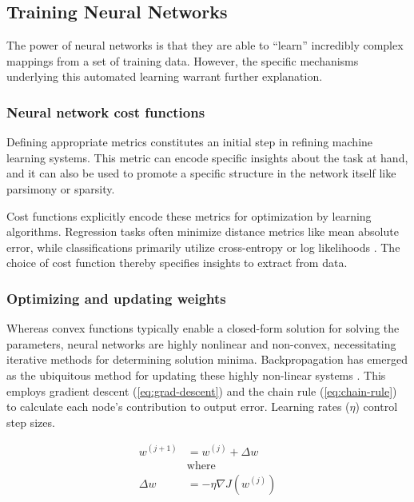 \subsection{Training Neural Networks}

The power of neural networks is that they are able to ``learn'' incredibly complex mappings from a set of training data.
However, the specific mechanisms underlying this automated learning warrant further explanation.

\subsubsection{Neural network cost functions}

Defining appropriate metrics constitutes an initial step in refining machine learning systems.
This metric can encode specific insights about the task at hand, and it can also be used to promote a specific structure in the network itself like parsimony or sparsity.

Cost functions explicitly encode these metrics for optimization by learning algorithms.
Regression tasks often minimize distance metrics like mean absolute error, while classifications primarily utilize cross-entropy or log likelihoods \cite{paszkePyTorchImperativeStyle2019}.
The choice of cost function thereby specifies insights to extract from data.

\subsubsection{Optimizing and updating weights}

Whereas convex functions typically enable a closed-form solution \cite{boydConvexOptimization2004} for solving the parameters, neural networks are highly nonlinear and non-convex, necessitating iterative methods for determining solution minima.
Backpropagation has emerged as the ubiquitous method for updating these highly non-linear systems \cite{rumelhartLearningRepresentationsBackpropagating1986}.
This employs gradient descent (\cref{eq:grad-descent}) and the chain rule (\cref{eq:chain-rule}) to calculate each node's contribution to output error.
Learning rates ($\eta$) control step sizes.

\begin{equation}
    \begin{aligned}
        w^{(j+1)} &= w^{(j)} + \Delta w\\
        &\text{where} \\
        \Delta w &= -\eta \nabla J(w^{(j)})
    \end{aligned}
    \label{eq:grad-descent}
\end{equation}

